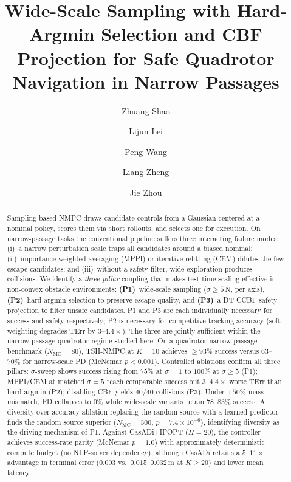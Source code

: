 \documentclass[11pt,onecolumn,a4paper]{article}
\newcommand{\Nm}{N_{\mathrm{MC}}}
\newcommand{\TErr}{\mathrm{TErr}}
\begin{document}
\title{\textbf{Wide-Scale Sampling with Hard-Argmin Selection and CBF Projection
for Safe Quadrotor Navigation in Narrow Passages}}

\author[1,*]{Zhuang Shao}
\author[2]{Lijun Lei}
\author[3]{Peng Wang}
\author[2]{Liang Zheng}
\author[2]{Jie Zhou}

\date{}
\maketitle

\begin{abstract}\noindent
Sampling-based NMPC draws candidate controls from a Gaussian centered at
a nominal policy, scores them via short rollouts, and selects one for
execution.  On narrow-passage tasks the conventional pipeline suffers
three interacting failure modes: (i)~a narrow perturbation scale traps
all candidates around a biased nominal; (ii)~importance-weighted
averaging (MPPI) or iterative refitting (CEM) dilutes the few escape
candidates; and (iii)~without a safety filter, wide exploration produces
collisions.  We identify a \emph{three-pillar} coupling that makes
test-time scaling effective in non-convex obstacle environments:
\textbf{(P1)}~wide-scale sampling ($\sigma \ge 5\,\mathrm{N}$, per axis),
\textbf{(P2)}~hard-argmin selection to preserve escape quality, and
\textbf{(P3)}~a DT-CCBF safety projection to filter unsafe candidates.
P1 and P3 are each individually necessary for success and safety
respectively; P2 is necessary for competitive tracking accuracy
(soft-weighting degrades $\TErr$ by $3$--$4.4\times$). The three are
jointly sufficient within the narrow-passage quadrotor regime studied here.
On a quadrotor narrow-passage benchmark ($\Nm = 80$), TSH-NMPC at
$K = 10$ achieves $\ge 93\%$ success versus $63$--$70\%$ for
narrow-scale PD (McNemar $p < 0.001$).  Controlled ablations confirm
all three pillars: $\sigma$-sweep shows success rising from $75\%$ at
$\sigma = 1$ to $100\%$ at $\sigma \ge 5$ (P1); MPPI/CEM at matched
$\sigma = 5$ reach comparable success but $3$--$4.4\times$ worse
$\TErr$ than hard-argmin (P2); disabling CBF yields $40/40$ collisions
(P3).  Under $+50\%$ mass mismatch, PD collapses
to $0\%$ while wide-scale variants retain $78$--$83\%$ success.  A
diversity-over-accuracy ablation replacing the random source with a
learned predictor finds the random source superior ($\Nm = 300$,
$p = 7.4 \times 10^{-6}$), identifying diversity as the driving
mechanism of P1.  Against CasADi+IPOPT ($H = 20$), the controller achieves
success-rate parity (McNemar $p = 1.0$) with approximately
deterministic compute budget (no NLP-solver dependency), although
CasADi retains a $5$--$11\times$ advantage in terminal error
($0.003$ vs.\ $0.015$--$0.032\,$m at $K \ge 20$) and lower mean
latency.
\end{abstract}
\end{document}
